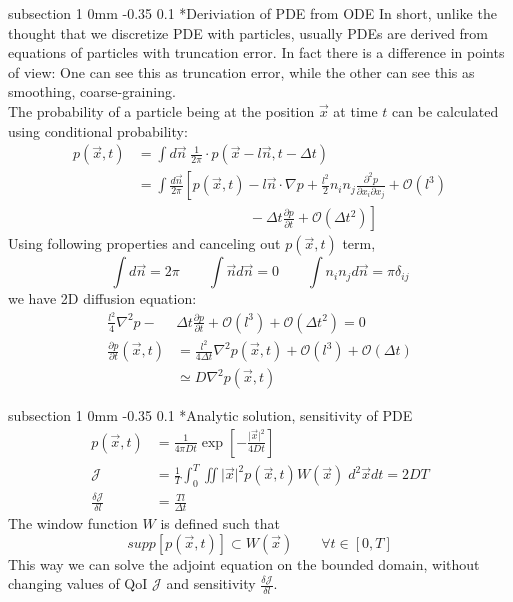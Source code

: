 \documentclass[11pt]{article}
\makeatletter
\renewcommand{\subsection}{\@startsection
{subsection}%
{1}%
{0mm}%
{-0.35\baselineskip}%
{0.1\baselineskip}%
{\normalfont\large\bfseries\color{brown}}}%
\def\Dpartial#1#2{ \frac{\partial #1}{\partial #2} }
\def\Del#1#2{ \frac{\delta #1}{\delta #2} }
\newcommand{\vn}{\vec{n}}
\newcommand{\vx}{\vec{x}}
\newcommand{\Dt}{\Delta t}
\newcommand{\cJ}{\mathcal{J}}
\makeatother
\begin{document}
\subsection*{Deriviation of PDE from ODE}
In short, unlike the thought that we discretize PDE with particles,
usually PDEs are derived from equations of particles with truncation error.
In fact there is a difference in points of view:
One can see this as truncation error, while the other can see this as smoothing, coarse-graining.\\
The probability of a particle being at the position $\vx$ at time $t$ can be calculated using conditional probability:
\begin{equation}
\begin{split}
p(\vx,t) &= \int d\vn\; \frac{1}{2\pi}\cdot p(\vx - l\vn, t-\Dt)\\
&= \int \frac{d\vn}{2\pi} \left[ p(\vx,t) - l\vn\cdot\nabla p + \frac{l^2}{2}n_in_j\frac{\partial^2p}{\partial x_i\partial x_j} + \mathcal{O}(l^3) \right.\\
&\left.\qquad\qquad\qquad\qquad -\Dt\Dpartial{p}{t} + \mathcal{O}(\Dt^2) \right]
\end{split}
\end{equation}
Using following properties and canceling out $p(\vx,t)$ term,
\begin{equation}
\int d\vn = 2\pi \qquad \int\vn d\vn = 0 \qquad \int n_in_j d\vn = \pi \delta_{ij}
\end{equation}
we have 2D diffusion equation:
\begin{equation}
\begin{split}
\frac{l^2}{4}\nabla^2p - &\Dt\Dpartial{p}{t} + \mathcal{O}(l^3) +\mathcal{O}(\Dt^2) = 0\\
\Dpartial{p}{t}(\vx,t) &= \frac{l^2}{4\Dt}\nabla^2p(\vx,t) + \mathcal{O}(l^3) +\mathcal{O}(\Dt)\\
&\simeq D\nabla^2p(\vx,t)
\end{split}
\end{equation}

\subsection*{Analytic solution, sensitivity of PDE}
\begin{equation}
\begin{split}
p(\vx,t) &= \frac{1}{4\pi Dt}\exp\left[ -\frac{\vert\vx\vert^2}{4Dt} \right]\\
\cJ &= \frac{1}{T}\int_0^T\iint \vert\vx\vert^2 p(\vx,t)W(\vx)\;d^2\vx dt = 2DT\\
\Del{\cJ}{l} &= \frac{Tl}{\Dt}
\end{split}
\end{equation}
The window function $W$ is defined such that
\begin{equation*}
supp\left[ p(\vx,t) \right] \subset W(\vx)\qquad\forall t\in[0,T]
\end{equation*}
This way we can solve the adjoint equation on the bounded domain, without changing values of QoI $\cJ$ and sensitivity $\Del{\cJ}{l}$.
\end{document}
